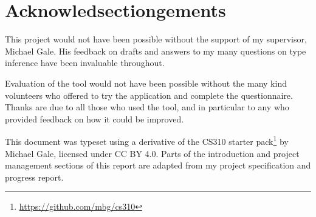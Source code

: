 \documentclass[a4paper,fleqn,twoside,12pt]{report}
\begin{document}
\chapter*{Acknowledsectiongements}\label{id:h.xqaef57orpsv}

This project would not have been possible without the support of my supervisor, Michael Gale. His feedback on drafts and answers to my many questions on type inference have been invaluable throughout.

Evaluation of the tool would not have been possible without the many kind volunteers who offered to try the application and complete the questionnaire. Thanks are due to all those who used the tool, and in particular to any who provided feedback on how it could be improved.

This document was typeset using a derivative of the CS310 starter pack\footnote{\href{https://github.com/mbg/cs310}{https://github.com/mbg/cs310}} by Michael Gale, licensed under CC BY 4.0. Parts of the introduction and project management sections of this report are adapted from my project specification and progress report.



\end{document}
